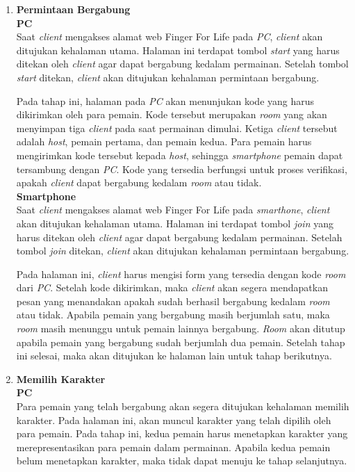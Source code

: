 \begin{enumerate}
	\item \textbf{Permintaan Bergabung} \\
	
	\textbf{PC} \\
	Saat \textit{client} mengakses alamat web Finger For Life pada \textit{PC}, \textit{client} akan ditujukan kehalaman utama. Halaman ini terdapat tombol \textit{start} yang harus ditekan oleh \textit{client} agar dapat bergabung kedalam permainan. Setelah tombol \textit{start} ditekan, \textit{client} akan ditujukan kehalaman permintaan bergabung. 
	
	Pada tahap ini, halaman pada \textit{PC} akan menunjukan kode yang harus dikirimkan oleh para pemain. Kode tersebut merupakan \textit{room} yang akan menyimpan tiga \textit{client} pada saat permainan dimulai. Ketiga \textit{client} tersebut adalah \textit{host}, pemain pertama, dan pemain kedua. Para pemain harus mengirimkan kode tersebut kepada \textit{host}, sehingga \textit{smartphone} pemain dapat tersambung dengan \textit{PC}. Kode yang tersedia berfungsi untuk proses verifikasi, apakah \textit{client} dapat bergabung kedalam \textit{room} atau tidak. \\
	
	\textbf{Smartphone} \\
	Saat \textit{client} mengakses alamat web Finger For Life pada \textit{smarthone}, \textit{client} akan ditujukan kehalaman utama. Halaman ini terdapat tombol \textit{join} yang harus ditekan oleh \textit{client} agar dapat bergabung kedalam permainan. Setelah tombol \textit{join} ditekan, \textit{client} akan ditujukan kehalaman permintaan bergabung.
	
	Pada halaman ini, \textit{client} harus mengisi form yang tersedia dengan kode \textit{room} dari \textit{PC}. Setelah kode dikirimkan, maka \textit{client} akan segera mendapatkan pesan yang menandakan apakah sudah berhasil bergabung kedalam \textit{room} atau tidak. Apabila pemain yang bergabung masih berjumlah satu, maka \textit{room} masih menunggu untuk pemain lainnya bergabung. \textit{Room} akan ditutup apabila pemain yang bergabung sudah berjumlah dua pemain. Setelah tahap ini selesai, maka akan ditujukan ke halaman lain untuk tahap berikutnya.
	
	\item \textbf{Memilih Karakter} \\
	
	\textbf{PC} \\
	Para pemain yang telah bergabung akan segera ditujukan kehalaman memilih karakter. Pada halaman ini, akan muncul karakter yang telah dipilih oleh para pemain. Pada tahap ini, kedua pemain harus menetapkan karakter yang merepresentasikan para pemain dalam permainan. Apabila kedua pemain belum menetapkan karakter, maka tidak dapat menuju ke tahap selanjutnya.
	

\end{enumerate}
